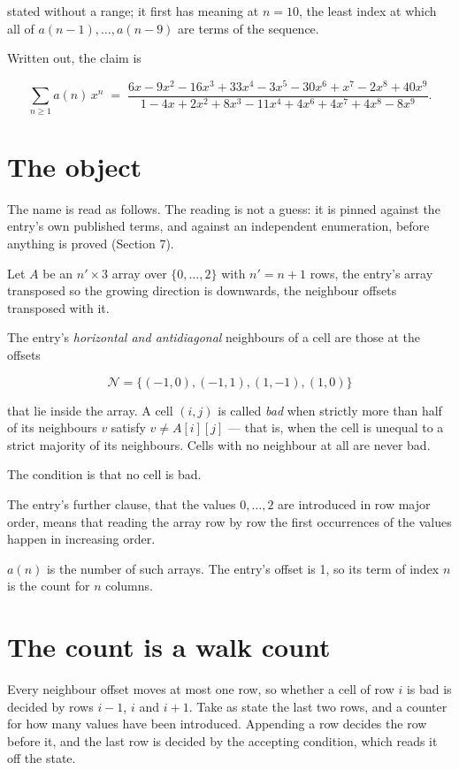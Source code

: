 \documentclass[11pt]{article}
\theoremstyle{definition}
\begin{document}
stated without a range; it first has meaning at $n = 10$, the least index at which all of $a(n-1),\dots,a(n-9)$ are terms of the sequence.

Written out, the claim is

\[\sum_{n \ge 1} a(n)\,x^n \;=\; \frac{6x - 9x^{2} - 16x^{3} + 33x^{4} - 3x^{5} - 30x^{6} + x^{7} - 2x^{8} + 40x^{9}}{1 - 4x + 2x^{2} + 8x^{3} - 11x^{4} + 4x^{6} + 4x^{7} + 4x^{8} - 8x^{9}}.\]

\section{The object}

The name is read as follows. The reading is not a guess: it is pinned against the entry's own published terms, and against an independent enumeration, before anything is proved (Section 7).

Let $A$ be an $n' \times 3$ array over $\{0,\dots,2\}$ with $n' = n + 1$ rows, the entry's array transposed so the growing direction is downwards, the neighbour offsets transposed with it.

The entry's {\itshape horizontal and antidiagonal} neighbours of a cell are those at the offsets

\[\mathcal{N} = \{(-1,0), (-1,1), (1,-1), (1,0)\}\]

that lie inside the array. A cell $(i,j)$ is called {\itshape bad} when strictly more than half of its neighbours $v$ satisfy $v \ne A[i][j]$ --- that is, when the cell is unequal to a strict majority of its neighbours. Cells with no neighbour at all are never bad.

The condition is that no cell is bad.

The entry's further clause, that the values $0,\dots,2$ are introduced in row major order, means that reading the array row by row the first occurrences of the values happen in increasing order.

$a(n)$ is the number of such arrays. The entry's offset is 1, so its term of index $n$ is the count for $n$ columns.

\section{The count is a walk count}

Every neighbour offset moves at most one row, so whether a cell of row $i$ is bad is decided by rows $i-1$, $i$ and $i+1$. Take as state the last two rows, and a counter for how many values have been introduced. Appending a row decides the row before it, and the last row is decided by the accepting condition, which reads it off the state.
\end{document}
